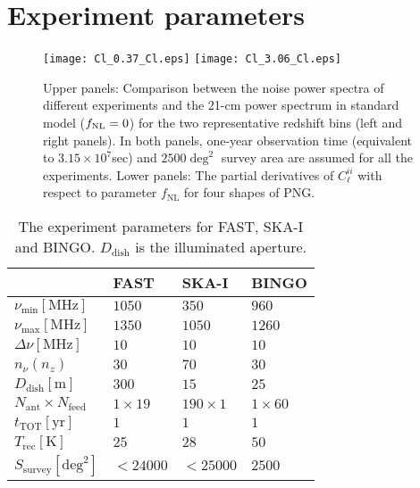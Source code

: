 \documentclass[twocolumn,floatfix,nofootinbib,aps,reprint]{revtex4}
\begin{document}
\section{Experiment parameters}\label{sec:exp}

\begin{figure*}[htb]
    \centerline{
    \texttt{[image: Cl\_0.37\_Cl.eps]}
    \texttt{[image: Cl\_3.06\_Cl.eps]}}
    \vspace{-0.6cm}
    \caption{Upper panels: Comparison between the noise power 
    spectra of different experiments and the 21-cm power spectrum in 
    standard model ($f_{\rm NL}=0$) for the two representative redshift bins 
    (left and right panels). In both panels, one-year observation time (equivalent to $3.15\times 10^{7}$sec) 
    and $2500\deg^2$ survey area are assumed for all the experiments.  
    Lower panels: The partial derivatives of $C_\ell^{ii}$ with respect 
        to parameter $f_\mathrm{NL}$ for four shapes of PNG.}\label{fig:clii}
\end{figure*}

\begin{table}[hb]
    \small
    \centering
    \caption{
        The experiment parameters for FAST, SKA-I and BINGO.
        $D_\mathrm{dish}$ is the illuminated aperture.
    }\label{tab:fast}
\begin{tabular}{L{2cm}|C{1.5cm}C{1.5cm}C{1.5cm}} \hline\hline
                                      & FAST        & SKA-I       & BINGO\\\hline
$\nu_\mathrm{min}[\mathrm{MHz}]$      & $1050$      & $350$       & $960$\\
$\nu_\mathrm{max}[\mathrm{MHz}]$      & $1350$      & $1050$      & $1260$\\
$\Delta\nu[\mathrm{MHz}]$             & $10$        & $10$        & $10$\\
$n_\nu (n_z)$                         & $30 $       & $70$        & $30$\\
$D_\mathrm{dish}[\mathrm{m}]$         & $300$       & $15$        & $25$\\
$N_\mathrm{ant}\times N_\mathrm{feed}$& $1\times19$ & $190\times1$& $1\times60$\\
$t_\mathrm{TOT}[\mathrm{yr}]$         & $1$         & $1$         & $1$\\
$T_\mathrm{rec}[\mathrm{K}]$    & $25$        & $28$        & $50$\\
$S_\mathrm{survey}[\mathrm{deg}^2]$   & $<24000$    & $<25000$    & $2500$\\\hline\hline

\end{tabular}
\end{table}
\end{document}

